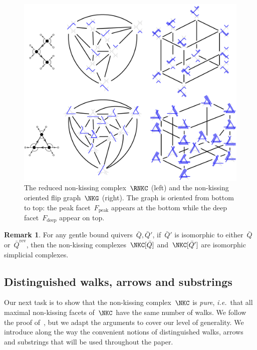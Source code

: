 \documentclass{memo-l}
\theoremstyle{definition}
\newtheorem{remark}[theorem]{Remark}
\newcommand{\ie}{\textit{i.e.}~} %
\newcommand{\darkblue}{\color{darkblue}} %
\newcommand{\defn}[1]{\textsl{\darkblue #1}} %
\newcommand{\peak}{\mathrm{peak}} %
\newcommand{\deep}{\mathrm{deep}} %
\newcommand{\reversed}[1]{#1^{\mathrm{rev}}} %
\begin{document}
\begin{figure}[t]
	\capstart
	\centerline{\includegraphics[scale=.5]{exmNKC}}
	\caption{The reduced non-kissing complex~$\RNKC$ (left) and the non-kissing oriented flip graph~$\NKG$ (right). The graph is oriented from bottom to top: the peak facet~$F_\peak$ appears at the bottom while the deep facet~$F_\deep$ appear on top.}
	\label{fig:exmNKC}
\end{figure}

\begin{remark}
\label{rem:reverseNKC}
For any gentle bound quivers~$\bar Q, \bar Q'$, if~$\bar Q'$ is isomorphic to either~$\bar Q$ or~$\reversed{\bar Q}$, then the non-kissing complexes~$\NKC[\bar Q]$ and~$\NKC[\bar Q']$ are isomorphic simplicial complexes.
\end{remark}

\subsection{Distinguished walks, arrows and substrings}
\label{subsec:distinguished}

Our next task is to show that the non-kissing complex~$\NKC$ is \defn{pure}, \ie that all maximal non-kissing facets of~$\NKC$ have the same number of walks.
We follow the proof of~\cite[Thm~3.2\,(1--2)]{McConville}, but we adapt the arguments to cover our level of generality.
We introduce along the way the convenient notions of distinguished walks, arrows and substrings that will be used throughout the paper.
\end{document}
